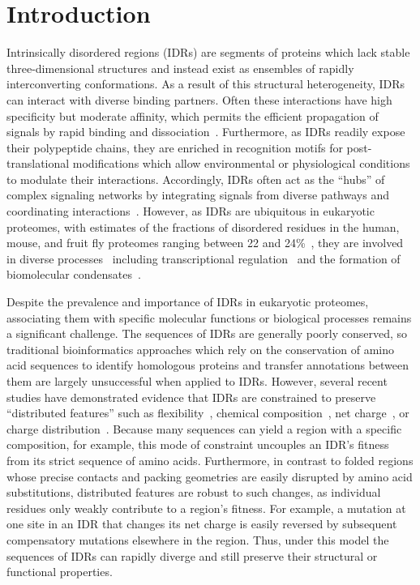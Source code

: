 
\section{Introduction}
Intrinsically disordered regions (IDRs) are segments of proteins which lack stable three-dimensional structures and instead exist as ensembles of rapidly interconverting conformations. As a result of this structural heterogeneity, IDRs can interact with diverse binding partners. Often these interactions have high specificity but moderate affinity, which permits the efficient propagation of signals by rapid binding and dissociation~\cite{Zhou2012, Wright2014}. Furthermore, as IDRs readily expose their polypeptide chains, they are enriched in recognition motifs for post-translational modifications which allow environmental or physiological conditions to modulate their interactions. Accordingly, IDRs often act as the ``hubs'' of complex signaling networks by integrating signals from diverse pathways and coordinating interactions~\cite{Dunker2005, Buljan2012}. However, as IDRs are ubiquitous in eukaryotic proteomes, with estimates of the fractions of disordered residues in the human, mouse, and fruit fly proteomes ranging between 22 and 24\%~\cite{Piovesan2020, Piovesan2022}, they are involved in diverse processes~\cite{vanderLee2014} including transcriptional regulation~\cite{Liu2006} and the formation of biomolecular condensates~\cite{Banani2017}.

Despite the prevalence and importance of IDRs in eukaryotic proteomes, associating them with specific molecular functions or biological processes remains a significant challenge. The sequences of IDRs are generally poorly conserved, so traditional bioinformatics approaches which rely on the conservation of amino acid sequences to identify homologous proteins and transfer annotations between them are largely unsuccessful when applied to IDRs. However, several recent studies have demonstrated evidence that IDRs are constrained to preserve ``distributed features'' such as flexibility~\cite{Daughdrill2007}, chemical composition~\cite{Moesa2012}, net charge~\cite{Zarin2017}, or charge distribution~\cite{Beh2012}. Because many sequences can yield a region with a specific composition, for example, this mode of constraint uncouples an IDR's fitness from its strict sequence of amino acids. Furthermore, in contrast to folded regions whose precise contacts and packing geometries are easily disrupted by amino acid substitutions, distributed features are robust to such changes, as individual residues only weakly contribute to a region's fitness. For example, a mutation at one site in an IDR that changes its net charge is easily reversed by subsequent compensatory mutations elsewhere in the region. Thus, under this model the sequences of IDRs can rapidly diverge and still preserve their structural or functional properties.

